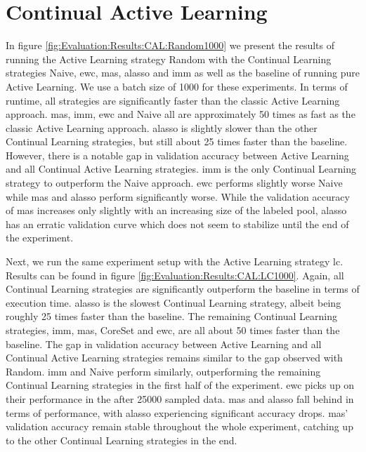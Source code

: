 \section{Continual Active Learning}
\label{sec:Appendix:ContinualActiveLearning}
In figure \ref{fig:Evaluation:Results:CAL:Random1000} we present the results of running the Active Learning strategy Random with the Continual Learning strategies Naive, \gls{ewc}, \gls{mas}, \gls{alasso} and \gls{imm}
as well as the baseline of running pure Active Learning. We use a batch size of 1000 for these experiments. In terms of runtime, all strategies are significantly faster than the classic Active
Learning approach. \gls{mas}, \gls{imm}, \gls{ewc} and Naive all are approximately 50 times as fast as the classic Active Learning approach. \gls{alasso} is slightly slower than the other Continual Learning strategies,
but still about 25 times faster than the baseline. However, there is a notable gap in validation accuracy between Active Learning and all Continual Active Learning strategies. \gls{imm} is the only
Continual Learning strategy to outperform the Naive approach. \gls{ewc} performs slightly worse Naive while \gls{mas} and \gls{alasso} perform significantly worse. While the validation accuracy of \gls{mas} increases only
slightly with an increasing size of the labeled pool, \gls{alasso} has an erratic validation curve which does not seem to stabilize until the end of the experiment. \par

Next, we run the same experiment setup with the Active Learning strategy \gls{lc}. Results can be found in figure \ref{fig:Evaluation:Results:CAL:LC1000}. Again, all Continual Learning strategies
are significantly outperform the baseline in terms of execution time. \gls{alasso} is the slowest Continual Learning strategy, albeit being roughly 25 times faster than the baseline. The remaining Continual
Learning strategies, \gls{imm}, \gls{mas}, CoreSet and \gls{ewc}, are all about 50 times faster than the baseline. The gap in validation accuracy between Active Learning and all Continual Active Learning strategies
remains similar to the gap observed with Random. \gls{imm} and Naive perform similarly, outperforming the remaining Continual Learning strategies in the first half of the experiment. \gls{ewc} picks up on their
performance in the after 25000 sampled data. \gls{mas} and \gls{alasso} fall behind in terms of performance, with \gls{alasso} experiencing significant accuracy drops. \gls{mas}' validation accuracy remain stable throughout
the whole experiment, catching up to the other Continual Learning strategies in the end. \par


